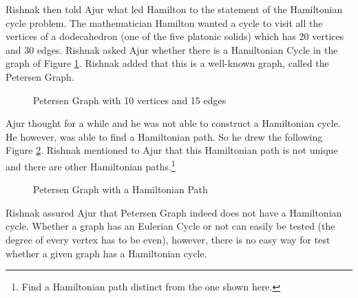 Rishnak then told Ajur what led Hamilton to the statement of the Hamiltonian cycle problem. The mathematician Hamilton wanted a cycle to visit 
all the vertices of a dodecahedron (one of the five platonic solids) which has 20 vertices and 30 edges. 
Rishnak asked Ajur whether there is a Hamiltonian Cycle in the graph of Figure \ref{5g3}. Rishnak added that this is a well-known graph, called the Petersen Graph.

\begin{figure}
\begin{center}
\caption{ Petersen Graph with 10 vertices and 15 edges }\label{5g3}
\end{center}
\end{figure}
Ajur thought for a while and he was not able to construct a Hamiltonian cycle. He however, was able to find a 
Hamiltonian path. So he drew the following Figure \ref{5g4}. Rishnak mentioned to Ajur that this Hamiltonian path is not unique and there are other Hamiltonian paths.\footnote{Find a Hamiltonian path distinct from the one shown here.}


\begin{figure}
\begin{center}
\caption{ Petersen Graph with a Hamiltonian Path}\label{5g4}
\end{center}
\end{figure}
Rishnak assured Ajur that Petersen Graph indeed does not have a Hamiltonian cycle. Whether a graph has an Eulerian Cycle or not can easily be tested (the degree of every vertex has to be even), however, there is no easy way for test whether a given graph has a Hamiltonian cycle. 

